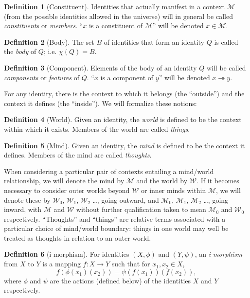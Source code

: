 \documentclass[pra,twocolumn,groupedaddress,10pt]{revtex4}
\theoremstyle{definition}
\newtheorem{defn}{Definition}[section]
\begin{document}
\begin{defn}[Constituent]
	Identities that actually manifest in a context $\mathcal{M}$ (from the possible identities allowed in the universe) will in general be called \emph{constituents} or \emph{members}. ``$x$ is a constituent of $\mathcal{M}$'' will be denoted $x \in \mathcal{M}$.
\end{defn}

\begin{defn}[Body]
	The set $B$ of identities that form an identity $Q$ is called the \emph{body} of $Q$; i.e. $\chi(Q) = B$.
\end{defn}

\begin{defn}[Component]
	Elements of the body of an identity $Q$ will be called \emph{components} or \emph{features} of $Q$. ``$x$ is a component of $y$'' will be denoted $x \twoheadrightarrow y$.
\end{defn}

For any identity, there is the context to which it belongs (the ``outside'') and the context it defines (the ``inside''). We will formalize these notions:

\begin{defn}[World]
	Given an identity, the \emph{world} is defined to be the context within which it exists. Members of the world are called \emph{things}.
\end{defn}

\begin{defn}[Mind]
	Given an identity, the \emph{mind} is defined to be the context it defines. Members of the mind are called \emph{thoughts}.
\end{defn}

When considering a particular pair of contexts entailing a mind/world relationship, we will denote the mind by $\mathcal{M}$ and the world by $\mathcal{W}$. If it becomes necessary to consider outer worlds beyond $\mathcal{W}$ or inner minds within $\mathcal{M}$, we will denote these by $\mathcal{W}_0$, $\mathcal{W}_1$, $\mathcal{W}_2$ \ldots, going outward, and $\mathcal{M}_0$, $\mathcal{M}_1$, $\mathcal{M}_2$ \ldots, going inward, with $\mathcal{M}$ and $\mathcal{W}$ without further qualification taken to mean $\mathcal{M}_0$ and $\mathcal{W}_0$ respectively. ``Thoughts'' and ``things'' are relative terms associated with a particular choice of mind/world boundary: things in one world may well be treated as thoughts in relation to an outer world.

\begin{defn}[i-morphism]
	For identities $(X, \phi)$ and $(Y, \psi)$, an \emph{i-morphism} from $X$ to $Y$ is a mapping $f : X \rightarrow Y$ such that for $x_1, x_2 \in X$,
	\begin{equation}
		f(\phi(x_1)(x_2)) = \psi(f(x_1))(f(x_2)) ,
		\nonumber
	\end{equation}
	where $\phi$ and $\psi$ are the actions (defined below) of the identities $X$ and $Y$ respectively.
\end{defn}
\end{document}

